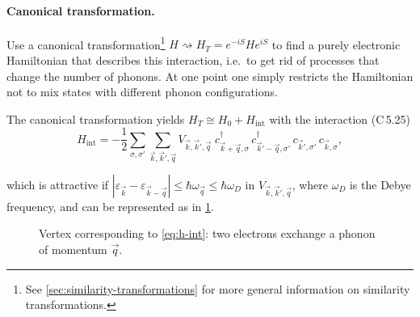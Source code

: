 \documentclass[../../main.tex]{subfiles}
\begin{document}
\paragraph{Canonical transformation.}
Use a canonical transformation\footnote{See \cref{sec:similarity-transformations} for more general information on similarity transformations.} $H\rightsquigarrow H_T=e^{-iS}He^{iS}$ to find a purely
electronic Hamiltonian that describes this interaction, i.e.\ to get rid of processes that
change the number of phonons. At one point one simply restricts the Hamiltonian not to mix
states with different phonon configurations.

The canonical transformation yields $H_T\cong H_0+H_{\mathrm{int}}$ with the interaction
(C\,5.25)
\begin{equation}
H_{\mathrm{int}} = -\frac12\sum_{\sigma,\sigma'}\sum_{\vec k,\vec k',\vec q}
  V_{\vec k,\vec k',\vec q}\;
  c^\dagger_{\vec k+\vec q,\sigma}\,c^\dagger_{\vec k'-\vec q,\sigma'}\,
  c_{\vec k',\sigma'}\,c_{\vec k,\sigma},
\label{eq:h-int}
\end{equation}

which is attractive if
$|\varepsilon_{\vec k}-\varepsilon_{\vec k-\vec q}|\le\hbar\omega_{\vec q}\le\hbar\omega_D$
in $V_{\vec k,\vec k',\vec q}$, where $\omega_D$ is the Debye frequency, and can be
represented as in \cref{fig:vertex}.

\begin{figure}[ht]
\centering
{}
\caption{Vertex corresponding to \cref{eq:h-int}: two electrons exchange a phonon of
momentum $\vec q$.}
\label{fig:vertex}
\end{figure}
\end{document}
